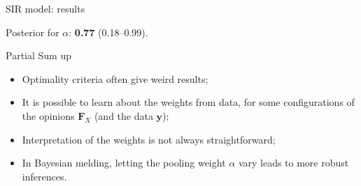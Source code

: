 \begin{frame}{SIR model: results}
\begin{figure}[!ht]
\begin{center}
\end{center}
\label{fig:SIR_results}
\end{figure}
Posterior for $\alpha$: \textbf{0.77} (0.18--0.99).
\end{frame}
\begin{frame}{Partial Sum up}
\begin{itemize}
 \item Optimality criteria often give weird results;\pause
 \item It is possible to learn about the weights from data, for some configurations of the opinions $\boldsymbol F_X$ (and the data $\boldsymbol y$);\pause
 \item Interpretation of the weights is not always straightforward;\pause
 \item In Bayesian melding, letting the pooling weight $\alpha$ vary leads to more robust inferences.
 \end{itemize}
\end{frame}
